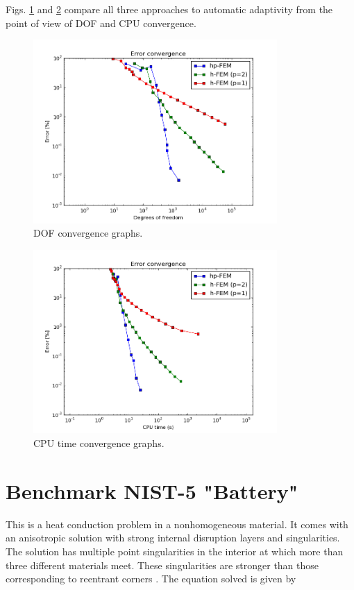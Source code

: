 \documentclass[12pt]{elsarticle}
\begin{document}
Figs. \ref{fig:nist-4-conv-dof} and \ref{fig:nist-4-conv-cpu} compare all
three approaches to automatic adaptivity from the point
of view of DOF and CPU convergence.

\begin{figure}[H]
\centering
\includegraphics[height=7cm]{nist/nist-4/conv_dof_aniso.png}
\caption{DOF convergence graphs.}
\label{fig:nist-4-conv-dof}
\end{figure}

\begin{figure}[H]
\centering
\vspace{-8mm}
\includegraphics[height=7cm]{nist/nist-4/conv_cpu_aniso.png}
\caption{CPU time convergence graphs.}
\label{fig:nist-4-conv-cpu}
\end{figure}


\section{Benchmark NIST-5 "Battery"}
\label{sec:bench-5}

This is a heat conduction problem in a nonhomogeneous material.
It comes with an anisotropic solution with strong internal disruption
layers and singularities.
The solution has multiple point singularities in the interior at which
more than three different materials meet. These singularities are stronger than those
corresponding to reentrant corners \cite{demkowicz-1}.
The equation solved is given by
\end{document}
